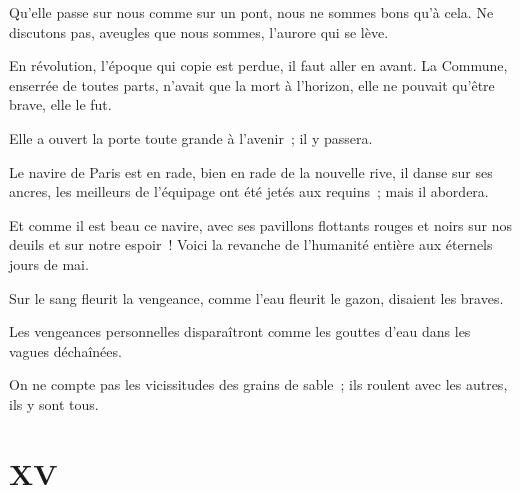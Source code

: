 \documentclass[french,twoside]{book} %
\newcommand\chapteropen{} %
\newcommand\chapterclose{} %
\begin{document}
Qu’elle passe sur nous comme sur un pont,  nous ne sommes bons qu’à cela. Ne discutons pas, aveugles que nous sommes, l’aurore qui se lève.\par
En révolution, l’époque qui copie est perdue, il faut aller en avant. La Commune, enserrée de toutes parts, n’avait que la mort à l’horizon, elle ne pouvait qu’être brave, elle le fut.\par
Elle a ouvert la porte toute grande à l’avenir ; il y passera.\par
Le navire de Paris est en rade, bien en rade de la nouvelle rive, il danse sur ses ancres, les meilleurs de l’équipage ont été jetés aux requins ; mais il abordera.\par
Et comme il est beau ce navire, avec ses pavillons flottants rouges et noirs sur nos deuils et sur notre espoir ! Voici la revanche de l’humanité entière aux éternels jours de mai.\par
Sur le sang fleurit la vengeance, comme l’eau fleurit le gazon, disaient les braves.\par
Les vengeances personnelles disparaîtront comme les gouttes d’eau dans les vagues déchaînées.\par
On ne compte pas les vicissitudes des grains de sable ; ils roulent avec les autres, ils y sont tous.
\chapterclose


\chapteropen
 \chapter[{XV}]{XV}
\label{p1.15}
\end{document}

